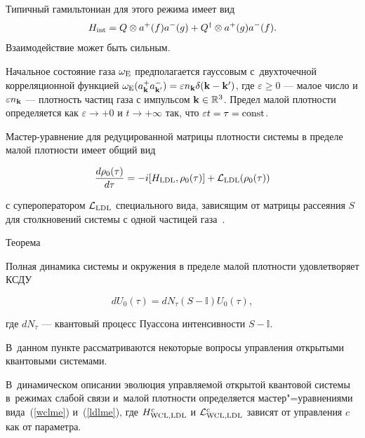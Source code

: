 Типичный гамильтониан для этого режима имеет вид $$H_{\rm int}=Q\otimes a^{+}(f)a^{-}(g) +Q^\dagger\otimes a^{+}(g)a^{-}(f).$$ Взаимодействие может быть сильным. 

Начальное состояние газа $\omega_{\rm E}$ предполагается гауссовым с~двухточечной корреляционной функцией $\omega_{\rm E}(a_{{\bf k}}^{+} a_{{\bf k}'}^{-})=\varepsilon  n_{\bf k}\delta ({\bf k}-{\bf k}')$, где $\varepsilon \ge 0$ --- малое число и $\varepsilon  n_{\bf k}$ --- плотность частиц газа с импульсом ${\bf k}\in\mathbb R^3$. Предел малой плотности определяется как $\varepsilon \to +0$ и $t\to+\infty$ так, что $\varepsilon  t=\tau={\rm const}$.



Мастер-уравнение для редуцированной матрицы плотности системы в пределе малой плотности имеет общий вид

\begin{equation}\label{ldlme}

 \frac{d\rho_0(\tau)}{d\tau}=-i[H_{\rm LDL},\rho_0(\tau)]+{\cal L}_{\rm LDL}(\rho_0(\tau))

\end{equation}

с супероператором ${\cal L}_{\rm LDL}$ специального вида, зависящим от матрицы рассеяния $S$ для столкновений системы с одной частицей газа~\cite{Dumcke}.



\smallskip

\begin{newthm}{Теорема \cite{LDL:QSDE2}}

Полная динамика системы и окружения в пределе малой плотности удовлетворяет КСДУ

\[

  dU_0(\tau)=dN_\tau(S-\mathbb I)U_0(\tau),

\]

где $dN_\tau$ --- квантовый процесс Пуассона интенсивности $S-\mathbb I$.

\end{newthm}





\pagebreak 

\hypertarget{Sec:control}{}


В~данном пункте рассматриваются некоторые вопросы управления открытыми квантовыми системами. 

В~динамическом описании эволюция управляемой открытой квантовой системы в~режимах слабой связи и~малой плотности определяется мастер"=уравнениями вида~(\ref{wclme}) и~(\ref{ldlme}), где $H_{\rm WCL, LDL}^c$ и ${\cal L}_{\rm WCL,LDL}^c$ зависят от управления $c$ как от параметра. 

